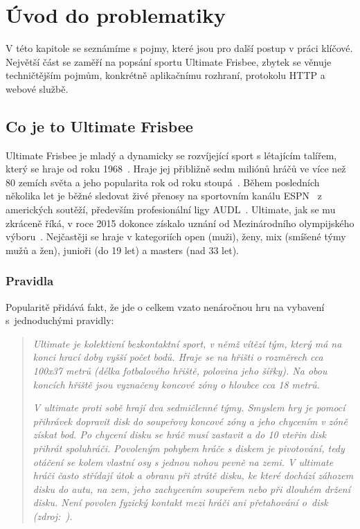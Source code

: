 \chapter{Úvod do problematiky}

  V této kapitole se seznámíme s pojmy, které jsou pro další postup v práci klíčové. 
  Největší část se zaměří na popsání sportu Ultimate Frisbee, zbytek se věnuje techničtějším pojmům,
  konkrétně aplikačnímu rozhraní, protokolu HTTP a webové službě.

\section{Co je to Ultimate Frisbee}

  Ultimate Frisbee je mladý a dynamicky se rozvíjející sport s létajícím talířem,
  který se hraje od roku 1968~\cite{cald_ultimate}. Hraje jej přibližně sedm miliónů
  hráčů ve více než 80 zemích světa a jeho popularita rok od roku stoupá~\cite{usa_ultimate}.
  Během posledních několika let je běžné sledovat živé přenosy na sportovním kanálu ESPN~\cite{espn}
  z amerických soutěží, především profesionální ligy AUDL~\cite{audl}. Ultimate, jak se mu zkráceně říká, v roce 2015 dokonce získalo
  uznání od Mezinárodního olympijského výboru~\cite{cald_uznani}. Nejčastěji se hraje v kategoriích
  open (muži), ženy, mix (smíšené týmy mužů a žen), junioři (do 19 let) a masters (nad 33 let).

\subsection{Pravidla}

  Popularitě přidává fakt, že jde o celkem vzato nenáročnou hru na vybavení s~jednoduchými pravidly:

\begin{quote}
  \textit{
    Ultimate je kolektivní bezkontaktní sport, v němž vítězí tým, který má na konci hrací doby
    vyšší počet bodů. Hraje se na hřišti o rozměrech cca 100x37 metrů (délka fotbalového hřiště,
    polovina jeho šířky). Na obou koncích hřiště jsou vyznačeny koncové zóny o hloubce cca 18 metrů.
  }
  
  \textit{
    V ultimate proti sobě hrají dva sedmičlenné týmy. Smyslem hry je pomocí přihrávek dopravit disk
    do soupeřovy koncové zóny a jeho chycením v zóně získat bod. Po chycení disku se hráč musí
    zastavit a do 10 vteřin disk přihrát spoluhráči. Povoleným pohybem hráče s diskem je pivotování,
    tedy otáčení se kolem vlastní osy s jednou nohou pevně na zemi. V ultimate hráči často střídají
    útok a obranu při ztrátě disku, ke které dochází záhozem disku do autu, na zem, jeho zachycením
    soupeřem nebo při dlouhém držení disku. Není povolen fyzický kontakt mezi hráči ani přetahování
    o~disk (zdroj:~\cite{cald_ultimate}).
  }
\end{quote}

